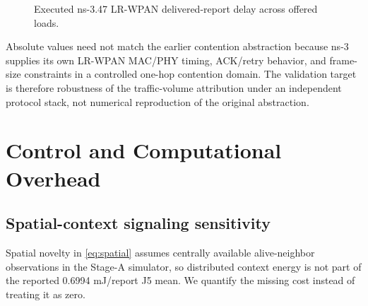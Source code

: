 \documentclass[pdflatex,sn-mathphys-num]{sn-jnl}
\begin{document}
\begin{figure}[t]
\centering
{}
\caption{Executed ns-3.47 LR-WPAN delivered-report delay across offered loads.}
\label{fig:ns3-delay}
\end{figure}

Absolute values need not match the earlier contention abstraction because ns-3 supplies its own LR-WPAN MAC/PHY timing, ACK/retry behavior, and frame-size constraints in a controlled one-hop contention domain. The validation target is therefore robustness of the traffic-volume attribution under an independent protocol stack, not numerical reproduction of the original abstraction.

\section{Control and Computational Overhead}

\subsection{Spatial-context signaling sensitivity}

Spatial novelty in \eqref{eq:spatial} assumes centrally available alive-neighbor observations in the Stage-A simulator, so distributed context energy is not part of the reported 0.6994 mJ/report J5 mean. We quantify the missing cost instead of treating it as zero.
\end{document}
